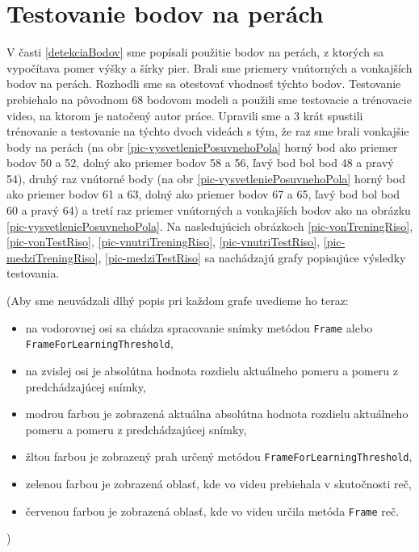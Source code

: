 \section{Testovanie bodov na perách}
V časti \ref{detekciaBodov} sme popísali použitie bodov na perách, z ktorých sa vypočítava pomer výšky a šírky pier. 
Brali sme priemery vnútorných a vonkajších bodov na perách. 
Rozhodli sme sa otestovať vhodnosť týchto bodov. 
Testovanie prebiehalo na pôvodnom 68 bodovom modeli a použili sme testovacie a trénovacie video, na ktorom je natočený autor práce.
Upravili sme a 3 krát spustili trénovanie a testovanie na týchto dvoch videách s tým, že raz sme brali vonkajšie body na perách (na obr \ref{pic-vysvetleniePosuvnehoPola} horný bod ako priemer bodov 50 a 52, dolný ako priemer bodov 58 a 56, ľavý bod bol bod 48 a pravý 54), druhý raz vnútorné body (na obr \ref{pic-vysvetleniePosuvnehoPola} horný bod ako priemer bodov 61 a 63, dolný ako priemer bodov 67 a 65, ľavý bod bol bod 60 a pravý 64) a tretí raz priemer vnútorných a vonkajších bodov ako na obrázku \ref{pic-vysvetleniePosuvnehoPola}.
Na nasledujúcich obrázkoch \ref{pic-vonTreningRiso}, \ref{pic-vonTestRiso}, \ref{pic-vnutriTreningRiso}, \ref{pic-vnutriTestRiso}, \ref{pic-medziTreningRiso}, \ref{pic-medziTestRiso} sa nachádzajú grafy popisujúce výsledky testovania.

(Aby sme neuvádzali dlhý popis pri každom grafe uvedieme ho teraz:
\begin{itemize}
\item na vodorovnej osi sa chádza spracovanie snímky metódou \texttt{Frame} alebo \texttt{FrameForLearningThreshold},
\item na zvislej osi je absolútna hodnota rozdielu aktuálneho pomeru a pomeru z predchádzajúcej snímky,
\item modrou farbou je zobrazená aktuálna absolútna hodnota rozdielu aktuálneho pomeru a pomeru z predchádzajúcej snímky,
\item žltou farbou je zobrazený prah určený metódou \texttt{FrameForLearningThreshold},
\item zelenou farbou je zobrazená oblasť, kde vo videu prebiehala v skutočnosti reč, 
\item červenou farbou je zobrazená oblasť, kde vo videu určila metóda \texttt{Frame} reč.
\end{itemize}
)

